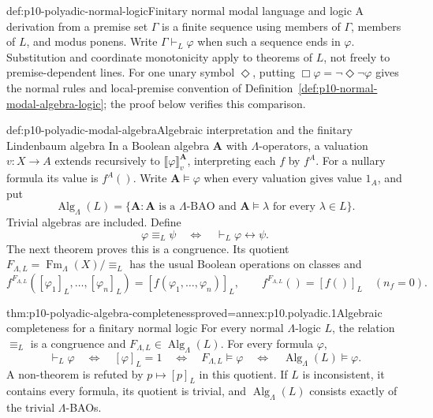 \begin{hbdefinition}{def:p10-polyadic-normal-logic}{Finitary normal modal language and logic}
A derivation from a premise set \(\Gamma\) is a finite sequence using
members of \(\Gamma\), members of \(L\), and modus ponens.
Write \(\Gamma\vdash_L\varphi\) when such a sequence ends in
\(\varphi\).  Substitution and coordinate monotonicity apply to
theorems of \(L\), not freely to premise-dependent lines.
For one unary symbol \(\Diamond\), putting
\(\Box\varphi=\neg\Diamond\neg\varphi\) gives the normal rules
and local-premise convention of
Definition~\ref{def:p10-normal-modal-algebra-logic}; the proof below
verifies this comparison.
\end{hbdefinition}

\begin{hbdefinition}{def:p10-polyadic-modal-algebra}{Algebraic interpretation and the finitary Lindenbaum algebra}
In a Boolean algebra \(\mathbf A\) with \(\Lambda\)-operators,
a valuation \(v:X\to A\) extends recursively to
\(\llbracket\varphi\rrbracket_v^{\mathbf A}\), interpreting each
\(f\) by \(f^A\).  For a nullary formula its value is \(f^A()\).
Write \(\mathbf A\models\varphi\) when every valuation gives value
\(1_A\), and put
\[
 \operatorname{Alg}_\Lambda(L)
   =\{\mathbf A:\mathbf A\text{ is a }\Lambda\text{-BAO and }
                     \mathbf A\models\lambda\text{ for every }\lambda\in L\}.
\]
Trivial algebras are included.
Define
\[
 \varphi\equiv_L\psi
       \quad\Longleftrightarrow\quad\vdash_L\varphi\leftrightarrow\psi.
\]
The next theorem proves this is a congruence.  Its quotient
\(F_{\Lambda,L}=\operatorname{Fm}_\Lambda(X)/{\equiv_L}\) has the
usual Boolean operations on classes and
\[
 f^{F_{\Lambda,L}}([\varphi_1]_L,\ldots,[\varphi_n]_L)
      =[f(\varphi_1,\ldots,\varphi_n)]_L,
 \qquad f^{F_{\Lambda,L}}()=[f()]_L\quad(n_f=0).
\]
\end{hbdefinition}

\begin{hbtheorem}{thm:p10-polyadic-algebra-completeness}{proved=annex:p10.polyadic.1}{Algebraic completeness for a finitary normal logic}
For every normal \(\Lambda\)-logic \(L\), the relation
\(\equiv_L\) is a congruence and
\(F_{\Lambda,L}\in\operatorname{Alg}_\Lambda(L)\).
For every formula \(\varphi\),
\[
 \vdash_L\varphi
 \quad\Longleftrightarrow\quad [\varphi]_L=1
 \quad\Longleftrightarrow\quad F_{\Lambda,L}\models\varphi
 \quad\Longleftrightarrow\quad
                  \operatorname{Alg}_\Lambda(L)\models\varphi.
\]
A non-theorem is refuted by \(p\mapsto[p]_L\) in this quotient.
If \(L\) is inconsistent, it contains every formula, its quotient
is trivial, and \(\operatorname{Alg}_\Lambda(L)\) consists exactly
of the trivial \(\Lambda\)-BAOs.
\end{hbtheorem}


